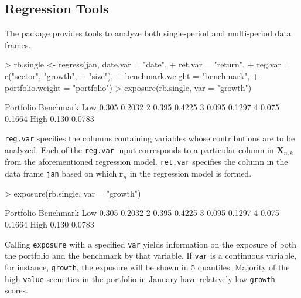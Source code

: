 \subsection{Regression Tools}

The  package provides tools to analyze
both single-period and multi-period data frames.

\begin{Schunk}
\begin{Sinput}
> rb.single <- regress(jan, date.var = "date",
+                 ret.var = "return",
+                 reg.var = c("sector", "growth",
+                   "size"),
+                 benchmark.weight = "benchmark",
+                 portfolio.weight = "portfolio")
> exposure(rb.single, var = "growth")
\end{Sinput}
\begin{Soutput}
     Portfolio Benchmark
Low      0.305    0.2032
2        0.395    0.4225
3        0.095    0.1297
4        0.075    0.1664
High     0.130    0.0783
\end{Soutput}
\end{Schunk}

\texttt{reg.var} specifies the columns containing variables whose
contributions are to be analyzed. Each of the \texttt{reg.var} input
corresponds to a particular column in $\mathbf{X}_{n,k}$ from the
aforementioned regression model. \texttt{ret.var} specifies the column
in the data frame \texttt{jan} based on which $\mathbf{r}_n$ in the
regression model is formed.

\begin{Schunk}
\begin{Sinput}
> exposure(rb.single, var = "growth")
\end{Sinput}
\begin{Soutput}
     Portfolio Benchmark
Low      0.305    0.2032
2        0.395    0.4225
3        0.095    0.1297
4        0.075    0.1664
High     0.130    0.0783
\end{Soutput}
\end{Schunk}

Calling \texttt{exposure} with a specified \texttt{var} yields
information on the exposure of both the portfolio and the benchmark by
that variable. If \texttt{var} is a continuous variable, for instance,
\texttt{growth}, the exposure will be shown in 5 quantiles. Majority
of the high \texttt{value} securities in the portfolio in January have
relatively low \texttt{growth} scores.


